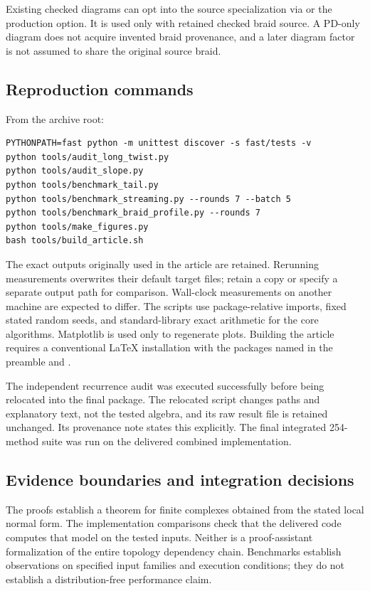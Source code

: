 Existing checked diagrams can opt into the source specialization via
 or the production
 option. It is used only with retained checked
braid source. A PD-only diagram does not acquire invented braid
provenance, and a later diagram factor is not assumed to share the
original source braid.

\subsection{Reproduction commands}

From the archive root:
\begin{lstlisting}
PYTHONPATH=fast python -m unittest discover -s fast/tests -v
python tools/audit_long_twist.py
python tools/audit_slope.py
python tools/benchmark_tail.py
python tools/benchmark_streaming.py --rounds 7 --batch 5
python tools/benchmark_braid_profile.py --rounds 7
python tools/make_figures.py
bash tools/build_article.sh
\end{lstlisting}

The exact outputs originally used in the article are retained.
Rerunning measurements overwrites their default target files; retain a
copy or specify a separate output path for comparison.
Wall-clock measurements on another machine are expected to differ.
The scripts use package-relative imports, fixed stated random seeds,
and standard-library exact arithmetic for the core algorithms.
Matplotlib is used only to regenerate plots.
Building the article requires a conventional LaTeX installation with
the packages named in the preamble and .

The independent recurrence audit was executed successfully before
being relocated into the final package. The relocated script changes
paths and explanatory text, not the tested algebra, and its raw result
file is retained unchanged. Its provenance note states this explicitly.
The final integrated 254-method suite was run on the delivered combined
implementation.

\subsection{Evidence boundaries and integration decisions}

The proofs establish a theorem for finite complexes obtained from the
stated local normal form. The implementation comparisons check that
the delivered code computes that model on the tested inputs.
Neither is a proof-assistant formalization of the entire topology
dependency chain.
Benchmarks establish observations on specified input families and
execution conditions; they do not establish a distribution-free
performance claim.

